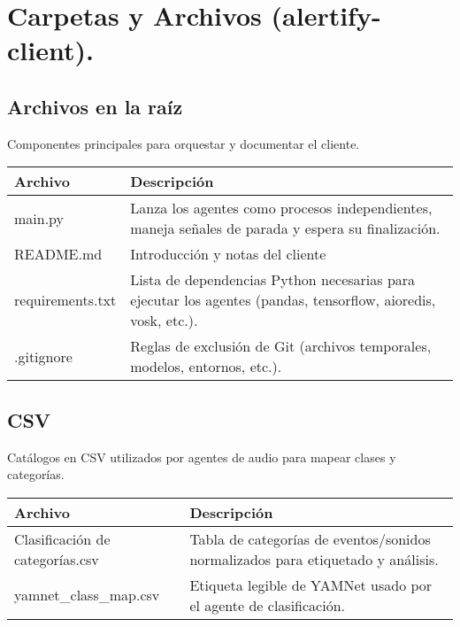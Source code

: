 \section*{Carpetas y Archivos (alertify-client).}

\subsection*{Archivos en la raíz}

Componentes principales para orquestar y documentar el cliente.

\begin{table}[H]
  \doublespacing
  \begin{tabularx}{\textwidth}{l X}
    \hline
    \textbf{Archivo} & \textbf{Descripción}                                                                       \\
    \hline
    main.py          &
    Lanza los agentes como procesos independientes, maneja señales de parada y espera su finalización.            \\
    README.md        &
    Introducción y notas del cliente                                                                              \\
    requirements.txt &
    Lista de dependencias Python necesarias para ejecutar los agentes (pandas, tensorflow, aioredis, vosk, etc.). \\
    .gitignore       &
    Reglas de exclusión de Git (archivos temporales, modelos, entornos, etc.).                                    \\
    \hline
  \end{tabularx}
\end{table}

\subsection*{CSV}

Catálogos en CSV utilizados por agentes de audio para mapear clases y categorías.

\begin{table}[H]
  \doublespacing
  \begin{tabularx}{\textwidth}{l X}
    \hline
    \textbf{Archivo}                & \textbf{Descripción}                          \\
    \hline
    Clasificación de categorías.csv &
    Tabla de categorías de eventos/sonidos normalizados para etiquetado y análisis. \\
    yamnet\_class\_map.csv          &
    Etiqueta legible de YAMNet usado por el agente de clasificación.                \\
    \hline
  \end{tabularx}
\end{table}

